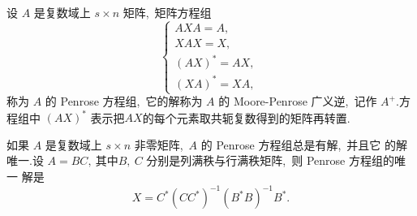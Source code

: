 \begin{definition}
	设  $A$  是复数域上  $s \times n $ 矩阵,\  矩阵方程组
	$$\left\{\begin{array}{l}
		A X A=A,\  \\
		X A X=X,\  \\
		(A X)^{*}=A X,\  \\
		(X A)^{*}=X A,\ 
	\end{array}\right.$$
	称为  $A $ 的 Penrose 方程组,\  它的解称为 $ A $ 的 Moore-Penrose 广义逆,\  记作  $A^{+}$.方程组中  $(A X)^{*} $ 表示把$  A X  $的每个元素取共轭复数得到的矩阵再转置.
\end{definition}
\begin{theorem}
	如果  $A $ 是复数域上 $ s \times n $ 非零矩阵,\  $ A $ 的 Penrose 方程组总是有解,\  并且它 的解唯一.设 $ A=B C ,\  $其中$  B ,\  C$  分别是列满秩与行满秩矩阵,\  则 Penrose 方程组的唯一 解是
	\begin{equation}
		X=C^{*}\left(C C^{*}\right)^{-1}\left(B^{*} B\right)^{-1} B^{*} .\label{1.6.8}
	\end{equation}
\end{theorem}
